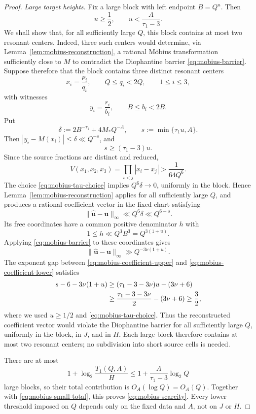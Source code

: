 \documentclass[11pt]{amsart}
\numberwithin{equation}{section}
\theoremstyle{definition}
\theoremstyle{remark}
\begin{document}
\begin{proof}
\smallskip
\noindent\textit{Large target heights.}
Fix a large block with left endpoint \(B=Q^u\). Then
\begin{equation}\label{eq:mobius-u-range}
u\geq\frac12,
\qquad
u<\frac{A}{\tau_1-3}.
\end{equation}
We shall show that, for all sufficiently large \(Q\), this block
contains at most two resonant centers. Indeed, three such centers
would determine, via Lemma~\ref{lem:mobius-reconstruction}, a rational
M\"obius transformation sufficiently close to \(M\) to contradict the
Diophantine barrier \eqref{eq:mobius-barrier}. Suppose therefore that
the block contains three distinct resonant centers
\[
x_i=\frac{p_i}{q_i},
\qquad Q\leq q_i<2Q,
\qquad1\leq i\leq3,
\]
with witnesses
\[
y_i=\frac{r_i}{b_i},
\qquad B\leq b_i<2B.
\]
Put
\[
\delta:=2B^{-\tau_1}+4M_*Q^{-A},
\qquad
s:=\min\{\tau_1u,A\}.
\]
Then \(|y_i-M(x_i)|\leq\delta\ll Q^{-s}\), and
\begin{equation}\label{eq:mobius-s-lower}
s\geq(\tau_1-3)u.
\end{equation}
Since the source fractions are distinct and reduced,
\[
V(x_1,x_2,x_3)
=\prod_{i<j}|x_i-x_j|
>\frac{1}{64Q^6}.
\]
The choice \eqref{eq:mobius-tau-choice} implies
\(Q^6\delta\to0\), uniformly in the block. Hence
Lemma~\ref{lem:mobius-reconstruction} applies for all sufficiently
large \(Q\), and produces a rational coefficient vector in the fixed
chart satisfying
\begin{equation}\label{eq:mobius-coefficient-upper}
\|\widehat{\mathbf u}-\mathbf u\|_\infty
\ll Q^6\delta
\ll Q^{6-s}.
\end{equation}
Its free coordinates have a common positive denominator \(h\) with
\[
1\leq h\ll Q^3B^3=Q^{3(1+u)}.
\]
Applying \eqref{eq:mobius-barrier} to these coordinates gives
\begin{equation}\label{eq:mobius-coefficient-lower}
\|\widehat{\mathbf u}-\mathbf u\|_\infty
\gg Q^{-3\nu(1+u)}.
\end{equation}
The exponent gap between \eqref{eq:mobius-coefficient-upper} and
\eqref{eq:mobius-coefficient-lower} satisfies
\begin{align}
 s-6-3\nu(1+u)
&\geq
(\tau_1-3-3\nu)u-(3\nu+6)\notag\\
&\geq
\frac{\tau_1-3-3\nu}{2}-(3\nu+6)
\geq\frac32,
\label{eq:mobius-exponent-gap}
\end{align}
where we used \(u\geq1/2\) and \eqref{eq:mobius-tau-choice}.
Thus the reconstructed coefficient vector would violate the
Diophantine barrier for all sufficiently large \(Q\), uniformly in the
block, in \(J\), and in \(H\). Each large block therefore contains at
most two resonant centers; no subdivision into short source cells is
needed.

There are at most
\[
1+\log_2\frac{T_1(Q,A)}H
\leq1+\frac{A}{\tau_1-3}\log_2Q
\]
large blocks, so their total contribution is \(O_A(\log Q)=O_A(Q)\).
Together with \eqref{eq:mobius-small-total}, this proves
\eqref{eq:mobius-scarcity}. Every lower threshold imposed on \(Q\)
depends only on the fixed data and \(A\), not on \(J\) or \(H\).
\end{proof}
\end{document}
